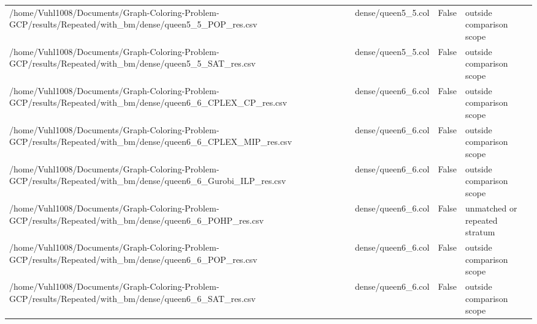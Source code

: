 \begin{table}[htbp]
\begin{tabular}{llll}
/home/Vuhl1008/Documents/Graph-Coloring-Problem-GCP/results/Repeated/with\_bm/dense/queen5\_5\_POP\_res.csv & dense/queen5\_5.col & False & outside comparison scope \\
/home/Vuhl1008/Documents/Graph-Coloring-Problem-GCP/results/Repeated/with\_bm/dense/queen5\_5\_SAT\_res.csv & dense/queen5\_5.col & False & outside comparison scope \\
/home/Vuhl1008/Documents/Graph-Coloring-Problem-GCP/results/Repeated/with\_bm/dense/queen6\_6\_CPLEX\_CP\_res.csv & dense/queen6\_6.col & False & outside comparison scope \\
/home/Vuhl1008/Documents/Graph-Coloring-Problem-GCP/results/Repeated/with\_bm/dense/queen6\_6\_CPLEX\_MIP\_res.csv & dense/queen6\_6.col & False & outside comparison scope \\
/home/Vuhl1008/Documents/Graph-Coloring-Problem-GCP/results/Repeated/with\_bm/dense/queen6\_6\_Gurobi\_ILP\_res.csv & dense/queen6\_6.col & False & outside comparison scope \\
/home/Vuhl1008/Documents/Graph-Coloring-Problem-GCP/results/Repeated/with\_bm/dense/queen6\_6\_POHP\_res.csv & dense/queen6\_6.col & False & unmatched or repeated stratum \\
/home/Vuhl1008/Documents/Graph-Coloring-Problem-GCP/results/Repeated/with\_bm/dense/queen6\_6\_POP\_res.csv & dense/queen6\_6.col & False & outside comparison scope \\
/home/Vuhl1008/Documents/Graph-Coloring-Problem-GCP/results/Repeated/with\_bm/dense/queen6\_6\_SAT\_res.csv & dense/queen6\_6.col & False & outside comparison scope \\
\hline
\end{tabular}
\end{table}
